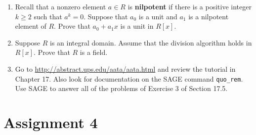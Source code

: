 \begin{enumerate}[label={\sffamily\bfseries\color{main}\arabic*.}]
	\item Recall that a nonzero element $a\in R$ is \textbf{nilpotent} if there is a positive integer $k\geq 2$ such that $a^k=0$. Suppose that $a_0$ is a unit and $a_1$ is a nilpotent element of $R$. Prove that $a_0+a_1x$ is a unit in $R[x]$.

	\item Suppose $R$ is an integral domain. Assume that the division algorithm holds in $R[x]$. Prove that $R$ is a field.

	\item Go to \url{http://abstract.ups.edu/aata/aata.html} and review the tutorial in Chapter 17. Also look for documentation on the SAGE command \verb|quo_rem|. Use SAGE to answer all of the problems of Exercise 3 of Section 17.5.
\end{enumerate}

\vfill\pagebreak

\section*{Assignment 4}

